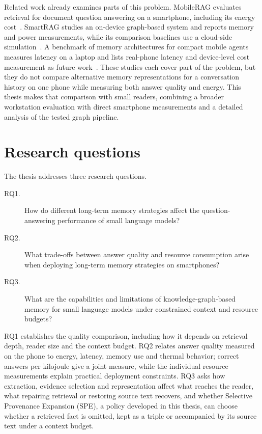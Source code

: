 Related work already examines parts of this problem. MobileRAG evaluates retrieval for
document question answering on a smartphone, including its energy
cost~\citep{mobilerag_energy}. SmartRAG studies an on-device graph-based system and
reports memory and power measurements, while its comparison baselines use a cloud-side
simulation~\citep{smartrag}. A benchmark of memory architectures for compact mobile agents
measures latency on a laptop and lists real-phone latency and device-level cost
measurement as future work~\citep{mobile_memory_architectures}. These studies each cover part
of the problem, but they do not compare alternative memory representations for a conversation
history on one phone while measuring both answer quality and energy. This thesis makes that
comparison with small readers,
combining a broader workstation evaluation with direct smartphone measurements and a
detailed analysis of the tested graph pipeline.

\section{Research questions}
\label{sec:ch1_research_questions}

The thesis addresses three research questions.

\begin{description}
  \item[RQ1.] How do different long-term memory strategies affect the question-answering
  performance of small language models?

  \item[RQ2.] What trade-offs between answer quality and resource consumption arise when
  deploying long-term memory strategies on smartphones?

  \item[RQ3.] What are the capabilities and limitations of knowledge-graph-based memory
  for small language models under constrained context and resource budgets?
\end{description}

RQ1 establishes the quality comparison, including how it depends on retrieval depth, reader
size and the context budget. RQ2 relates answer quality measured on the phone to energy, latency, memory use
and thermal behavior; correct answers per kilojoule give a joint measure, while the individual
resource measurements explain practical deployment constraints. RQ3 asks how extraction,
evidence selection and representation affect what reaches the reader, what repairing retrieval
or restoring source text recovers, and whether Selective Provenance Expansion (SPE), a policy
developed in this thesis, can choose whether a retrieved fact is omitted, kept as a triple or
accompanied by its source text under a context budget.

